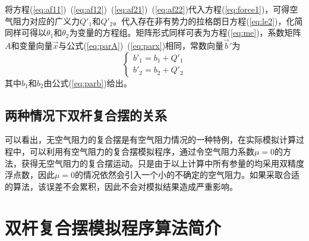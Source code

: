 \documentclass[a4paper,12pt,titlepage]{article}
\begin{document}
将方程(\ref{eq:af11})~(\ref{eq:af12})~(\ref{eq:af21})~(\ref{eq:af22})代入方程(\ref{eq:force1})，可得空气阻力对应的广义力$Q'_1$和$Q'_2$。代入存在非有势力的拉格朗日方程(\ref{eq:le2})，化简同样可得以$\ddot{\theta}_1$和$\ddot{\theta}_2$为变量的方程组。矩阵形式同样可表为方程(\ref{eq:me})，系数矩阵$A$和变量向量$\vec{x}$与公式(\ref{eq:parA})~(\ref{eq:parx})相同，常数向量$\vec{b}'$为
\begin{equation}
	\begin{cases}
		b'_1=b_1+Q'_1\\
		b'_2=b_2+Q'_2
	\end{cases}
\end{equation}
其中$b_1$和$b_2$由公式(\ref{eq:parb})给出。

\subsection{两种情况下双杆复合摆的关系}
可以看出，无空气阻力的复合摆是有空气阻力情况的一种特例，在实际模拟计算过程中，可以利用有空气阻力的复合摆模拟程序，通过令空气阻力系数$\mu=0$的方法，获得无空气阻力的复合摆运动。只是由于以上计算中所有参量的均采用双精度浮点数，因此$\mu=0$的情况依然会引入一个小的不确定的空气阻力。如果采取合适的算法，该误差不会累积，因此不会对模拟结果造成严重影响。

\section{双杆复合摆模拟程序算法简介} %
\end{document}
